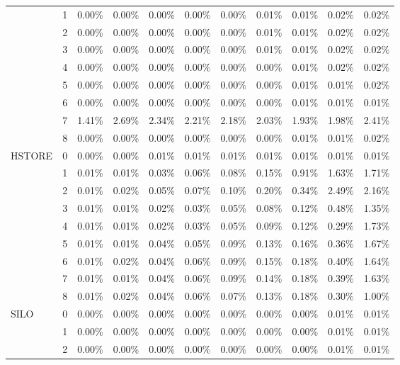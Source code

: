 \begin{tabular}{llrrrrrrrrr}
       & 1 & 0.00\% & 0.00\% & 0.00\% & 0.00\% & 0.00\% & 0.01\% & 0.01\% & 0.02\% & 0.02\% \\
       & 2 & 0.00\% & 0.00\% & 0.00\% & 0.00\% & 0.00\% & 0.01\% & 0.01\% & 0.02\% & 0.02\% \\
       & 3 & 0.00\% & 0.00\% & 0.00\% & 0.00\% & 0.00\% & 0.01\% & 0.01\% & 0.02\% & 0.02\% \\
       & 4 & 0.00\% & 0.00\% & 0.00\% & 0.00\% & 0.00\% & 0.00\% & 0.01\% & 0.02\% & 0.02\% \\
       & 5 & 0.00\% & 0.00\% & 0.00\% & 0.00\% & 0.00\% & 0.00\% & 0.01\% & 0.01\% & 0.02\% \\
       & 6 & 0.00\% & 0.00\% & 0.00\% & 0.00\% & 0.00\% & 0.00\% & 0.01\% & 0.01\% & 0.01\% \\
       & 7 & 1.41\% & 2.69\% & 2.34\% & 2.21\% & 2.18\% & 2.03\% & 1.93\% & 1.98\% & 2.41\% \\
       & 8 & 0.00\% & 0.00\% & 0.00\% & 0.00\% & 0.00\% & 0.00\% & 0.01\% & 0.01\% & 0.02\% \\
HSTORE & 0 & 0.00\% & 0.00\% & 0.01\% & 0.01\% & 0.01\% & 0.01\% & 0.01\% & 0.01\% & 0.01\% \\
       & 1 & 0.01\% & 0.01\% & 0.03\% & 0.06\% & 0.08\% & 0.15\% & 0.91\% & 1.63\% & 1.71\% \\
       & 2 & 0.01\% & 0.02\% & 0.05\% & 0.07\% & 0.10\% & 0.20\% & 0.34\% & 2.49\% & 2.16\% \\
       & 3 & 0.01\% & 0.01\% & 0.02\% & 0.03\% & 0.05\% & 0.08\% & 0.12\% & 0.48\% & 1.35\% \\
       & 4 & 0.01\% & 0.01\% & 0.02\% & 0.03\% & 0.05\% & 0.09\% & 0.12\% & 0.29\% & 1.73\% \\
       & 5 & 0.01\% & 0.01\% & 0.04\% & 0.05\% & 0.09\% & 0.13\% & 0.16\% & 0.36\% & 1.67\% \\
       & 6 & 0.01\% & 0.02\% & 0.04\% & 0.06\% & 0.09\% & 0.15\% & 0.18\% & 0.40\% & 1.64\% \\
       & 7 & 0.01\% & 0.01\% & 0.04\% & 0.06\% & 0.09\% & 0.14\% & 0.18\% & 0.39\% & 1.63\% \\
       & 8 & 0.01\% & 0.02\% & 0.04\% & 0.06\% & 0.07\% & 0.13\% & 0.18\% & 0.30\% & 1.00\% \\
SILO & 0 & 0.00\% & 0.00\% & 0.00\% & 0.00\% & 0.00\% & 0.00\% & 0.00\% & 0.01\% & 0.01\% \\
       & 1 & 0.00\% & 0.00\% & 0.00\% & 0.00\% & 0.00\% & 0.00\% & 0.00\% & 0.01\% & 0.01\% \\
       & 2 & 0.00\% & 0.00\% & 0.00\% & 0.00\% & 0.00\% & 0.00\% & 0.00\% & 0.01\% & 0.01\% \\

\end{tabular}

